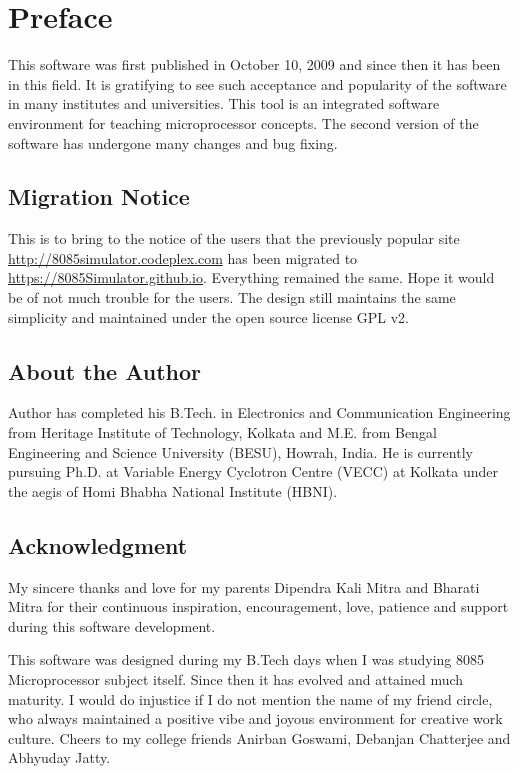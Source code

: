 \chapter*{Preface}
This software was first published in October 10, 2009 and since then it has been in this field. It is gratifying to see such acceptance and popularity of the software in many institutes and universities. This tool is an integrated software environment for teaching microprocessor concepts.
The second version of the software has undergone many changes and bug fixing. 

\section*{Migration Notice}
This is to bring to the notice of the users that the previously popular site \url{http://8085simulator.codeplex.com} has been migrated to \url{https://8085Simulator.github.io}. 
Everything remained the same. Hope it would be of not much trouble for the users. The design still maintains the same simplicity and  maintained under the open source license GPL v2.

\section*{About the Author} 

Author has completed his B.Tech. in Electronics and Communication Engineering from Heritage Institute of Technology, Kolkata and M.E. from Bengal Engineering and Science University (BESU), Howrah, India. He is currently pursuing Ph.D. at Variable Energy Cyclotron Centre (VECC) at Kolkata under the aegis of Homi Bhabha National Institute (HBNI).

\section*{Acknowledgment}
My sincere thanks and love for my parents Dipendra Kali Mitra and Bharati Mitra for their continuous inspiration, encouragement, love, patience and support during this software development. 

This software was designed during my B.Tech days when I was studying 8085 Microprocessor subject itself. Since then it has evolved and attained much maturity. I would do injustice if I do not mention the name of my friend circle, who always maintained a positive vibe and joyous environment for creative work culture. Cheers to my college friends Anirban Goswami, Debanjan Chatterjee and Abhyuday Jatty.

